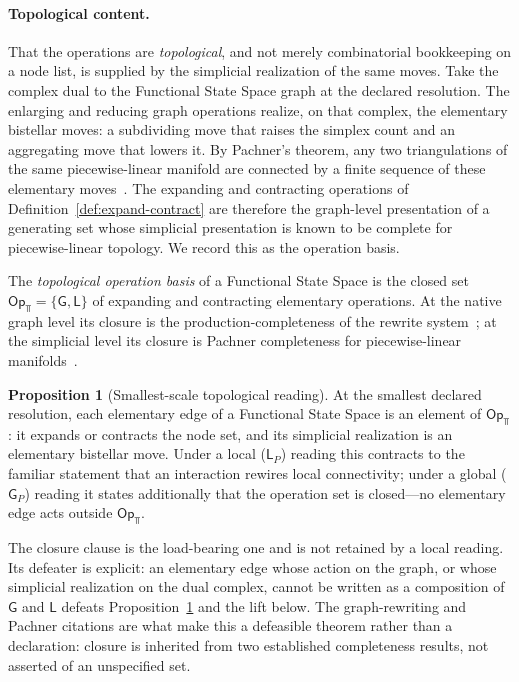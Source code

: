 \documentclass[10pt,twoside,a5paper]{article}
\theoremstyle{definition}
\newtheorem{claimprop}{Proposition}
\begin{document}
\paragraph{Topological content.}
That the operations are \emph{topological}, and not merely combinatorial bookkeeping
on a node list, is supplied by the simplicial realization of the same moves. Take the
complex dual to the Functional State Space graph at the declared resolution. The
enlarging and reducing graph operations realize, on that complex, the elementary
bistellar moves: a subdividing move that raises the simplex count and an aggregating
move that lowers it. By Pachner's theorem, any two triangulations of the same
piecewise-linear manifold are connected by a finite sequence of these elementary
moves~\cite{Pachner1991,Lickorish1999}. The expanding and contracting operations of
Definition~\ref{def:expand-contract} are therefore the graph-level presentation of a
generating set whose simplicial presentation is known to be complete for
piecewise-linear topology. We record this as the operation basis.

\begin{definition}
\label{def:operation-basis}
The \emph{topological operation basis} of a Functional State Space is the closed set
$\mathsf{Op}_{\Top}=\{\mathsf{G},\mathsf{L}\}$ of expanding and contracting elementary
operations. At the native graph level its closure is the production-completeness of
the rewrite system~\cite{Ehrig2006}; at the simplicial level its closure is Pachner
completeness for piecewise-linear manifolds~\cite{Pachner1991}.
\end{definition}

\begin{claimprop}[Smallest-scale topological reading]
\label{prop:smallest-scale}
At the smallest declared resolution, each elementary edge of a Functional State Space
is an element of $\mathsf{Op}_{\Top}$: it expands or contracts the node set, and its
simplicial realization is an elementary bistellar move. Under a local
($\mathsf{L}_{P}$) reading this contracts to the familiar statement that an
interaction rewires local connectivity; under a global ($\mathsf{G}_{P}$) reading it
states additionally that the operation set is closed---no elementary edge acts outside
$\mathsf{Op}_{\Top}$.
\end{claimprop}

The closure clause is the load-bearing one and is not retained by a local reading. Its
defeater is explicit: an elementary edge whose action on the graph, or whose
simplicial realization on the dual complex, cannot be written as a composition of
$\mathsf{G}$ and $\mathsf{L}$ defeats Proposition~\ref{prop:smallest-scale} and the
lift below. The graph-rewriting and Pachner citations are what make this a defeasible
theorem rather than a declaration: closure is inherited from two established
completeness results, not asserted of an unspecified set.
\end{document}

